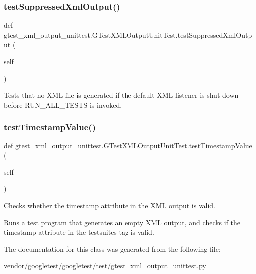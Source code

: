 \subsubsection{\texorpdfstring{test\+Suppressed\+Xml\+Output()}{testSuppressedXmlOutput()}}
{\footnotesize\ttfamily def gtest\+\_\+xml\+\_\+output\+\_\+unittest.\+G\+Test\+X\+M\+L\+Output\+Unit\+Test.\+test\+Suppressed\+Xml\+Output (\begin{DoxyParamCaption}\item[{}]{self }\end{DoxyParamCaption})}

\begin{DoxyVerb}Tests that no XML file is generated if the default XML listener is
shut down before RUN_ALL_TESTS is invoked.
\end{DoxyVerb}
 \mbox{\label{classgtest__xml__output__unittest_1_1_g_test_x_m_l_output_unit_test_a828521a7ae57f650e1e9ca4beb34336a}} 
\subsubsection{\texorpdfstring{test\+Timestamp\+Value()}{testTimestampValue()}}
{\footnotesize\ttfamily def gtest\+\_\+xml\+\_\+output\+\_\+unittest.\+G\+Test\+X\+M\+L\+Output\+Unit\+Test.\+test\+Timestamp\+Value (\begin{DoxyParamCaption}\item[{}]{self }\end{DoxyParamCaption})}

\begin{DoxyVerb}Checks whether the timestamp attribute in the XML output is valid.

Runs a test program that generates an empty XML output, and checks if
the timestamp attribute in the testsuites tag is valid.
\end{DoxyVerb}
 

The documentation for this class was generated from the following file\+:\begin{DoxyCompactItemize}
\item 
vendor/googletest/googletest/test/gtest\+\_\+xml\+\_\+output\+\_\+unittest.\+py\end{DoxyCompactItemize}

